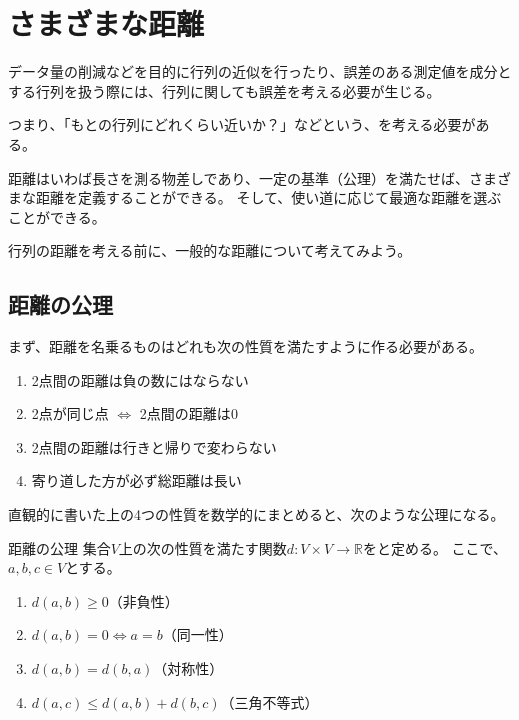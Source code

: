 \documentclass[../../../topic_linear-algebra]{subfiles}
\begin{document}
\sectionline
\section{さまざまな距離}

データ量の削減などを目的に行列の近似を行ったり、誤差のある測定値を成分とする行列を扱う際には、行列に関しても誤差を考える必要が生じる。

つまり、「もとの行列にどれくらい近いか？」などという、を考える必要がある。

\br

距離はいわば長さを測る物差しであり、一定の基準（公理）を満たせば、さまざまな距離を定義することができる。
そして、使い道に応じて最適な距離を選ぶことができる。

\br

行列の距離を考える前に、一般的な距離について考えてみよう。

\subsection{距離の公理}

まず、距離を名乗るものはどれも次の性質を満たすように作る必要がある。

\begin{enumerate}[label=\romanlabel]
  \item 2点間の距離は負の数にはならない
  \item 2点が同じ点 $\Longleftrightarrow$ 2点間の距離は$0$
  \item 2点間の距離は行きと帰りで変わらない
  \item 寄り道した方が必ず総距離は長い
\end{enumerate}

直観的に書いた上の4つの性質を数学的にまとめると、次のような公理になる。

\begin{definition*}{距離の公理}
  集合$V$上の次の性質を満たす関数$d \colon V\times V \to \mathbb{R}$をと定める。
  ここで、$a,b,c \in V$とする。
  \begin{enumerate}[label=\romanlabel]
    \item $d(a,b) \geq 0$（非負性）
    \item $d(a,b) = 0 \Longleftrightarrow a = b$（同一性）
    \item $d(a,b) = d(b,a)$（対称性）
    \item $d(a,c) \leq d(a,b) + d(b,c)$（三角不等式）
  \end{enumerate}
\end{definition*}
\end{document}

